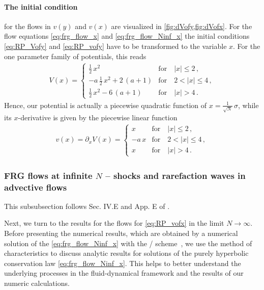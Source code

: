 \paragraph{The \uv{} initial condition} for the flows in $v(y)$ and $v(x)$ are visualized in \cref{fig:dVofy,fig:dVofx}.
For the \frg{} flow equations \eqref{eq:frg_flow_x} and \eqref{eq:frg_flow_Ninf_x} the initial conditions \eqref{eq:RP_Vofy} and \eqref{eq:RP_vofy} have to be transformed to the variable $x$. For the one parameter family of \uv{} potentials, this reads
	\begin{align}
		V ( x ) =
		\begin{cases}
			\tfrac{1}{2} \, x^2							&	\text{for} \quad |x| \leq 2 \, ,\\[.1em]
			- a \, \tfrac{1}{2} \, x^2 + 2 \, ( a + 1 )	&	\text{for} \quad 2 < |x| \leq 4 \, ,\\[.1em]
			\tfrac{1}{2} \, x^2 - 6 \, ( a + 1 )		&	\text{for} \quad |x|>4 \, .
		\end{cases}\label{eq:RP_Vofx}
	\end{align}
Hence, our \uv{} potential is actually a piecewise quadratic function of $x = \tfrac{1}{\sqrt{N}} \, \sigma$, while its $x$-derivative is given by the piecewise linear function
	\begin{align}
		v ( x ) = \partial_x V ( x ) =
		\begin{cases}
			x		&	\text{for} \quad |x| \leq 2 \, ,\\[.1em]
			- a \, x	&	\text{for} \quad 2 < |x| \leq 4 \, ,\\[.1em]
			x		&	\text{for} \quad |x|>4 \, .
		\end{cases} \label{eq:RP_vofx}
	\end{align}

\FloatBarrier
\subsubsection{FRG flows at infinite \texorpdfstring{$N$}{N} -- shocks and rarefaction waves in advective flows}\label{subsubsec:FRGlargeNinf}
\begin{disclaimer}
	This subsubsection follows Sec. IV.E and App. E of .
\end{disclaimer}
Next, we turn to the results for the \frg{} flows for \cref{eq:RP_vofx} in the limit $N \rightarrow \infty$.
Before presenting the numerical results, which are obtained by a numerical solution of the \pde{} \eqref{eq:frg_flow_Ninf_x} with the \kt{}/\knp{} scheme~\cite{KTO2-0,KTO2-1}, we use the method of characteristics to discuss analytic results for solutions of the purely hyperbolic conservation law \eqref{eq:frg_flow_Ninf_x}.
This helps to better understand the underlying processes in the fluid-dynamical framework and the results of our numeric calculations.

